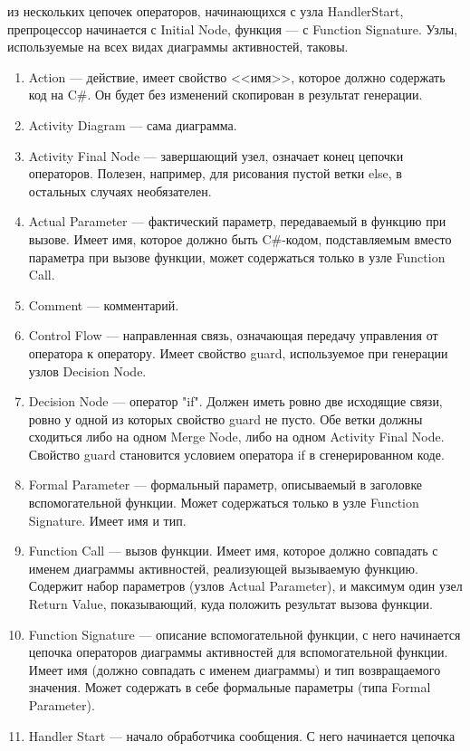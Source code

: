 \begin{enumerate}
		из нескольких цепочек операторов, начинающихся с узла HandlerStart, препроцессор 
		начинается с Initial Node, функция --- с Function Signature. Узлы, используемые 
		на всех видах диаграммы активностей, таковы.
		\begin{enumerate}
			\item Action --- действие, имеет свойство <<имя>>, которое должно содержать код 
				на C\#. Он будет без изменений скопирован в результат генерации.
			\item Activity Diagram --- сама диаграмма.
			\item Activity Final Node --- завершающий узел, означает конец цепочки операторов. 
				Полезен, например, для рисования пустой ветки else, в остальных случаях необязателен.
			\item Actual Parameter --- фактический параметр, передаваемый в функцию при вызове. 
				Имеет имя, которое должно быть C\#-кодом, подставляемым вместо параметра при 
				вызове функции, может содержаться только в узле Function Call.
			\item Comment --- комментарий.
			\item Control Flow --- направленная связь, означающая передачу управления от 
				оператора к оператору. Имеет свойство guard, используемое при генерации узлов 
				Decision Node.
			\item Decision Node --- оператор "if". Должен иметь ровно две исходящие связи, 
				ровно у одной из которых свойство guard не пусто. Обе ветки должны сходиться 
				либо на одном Merge Node, либо на одном Activity Final Node. Свойство guard 
				становится условием оператора if в сгенерированном коде.
			\item Formal Parameter --- формальный параметр, описываемый в заголовке вспомогательной 
				функции. Может содержаться только в узле Function Signature. Имеет имя и тип.
			\item Function Call --- вызов функции. Имеет имя, которое должно совпадать с 
				именем диаграммы активностей, реализующей вызываемую функцию. Содержит набор 
				параметров (узлов Actual Parameter), и максимум один узел Return Value, показывающий, 
				куда положить результат вызова функции.
			\item Function Signature --- описание вспомогательной функции, с него начинается 
				цепочка операторов диаграммы активностей для вспомогательной функции. Имеет имя 
				(должно совпадать с именем диаграммы) и тип возвращаемого значения. Может 
				содержать в себе формальные параметры (типа Formal Parameter).
			\item Handler Start --- начало обработчика сообщения. С него начинается цепочка 

\end{enumerate}
\end{enumerate}
